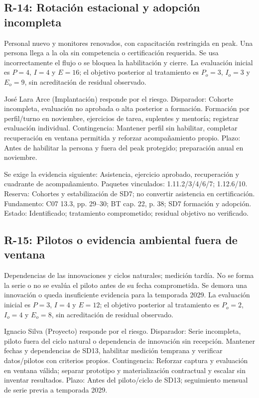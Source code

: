 \subsection{R-14: Rotación estacional y adopción incompleta}
Personal nuevo y monitores renovados, con capacitación restringida en peak. Una persona llega a la ola sin competencia o certificación requerida. Se usa incorrectamente el flujo o se bloquea la habilitación y cierre. La evaluación inicial es $P=4$, $I=4$ y $E=16$; el objetivo posterior al tratamiento es $P_o=3$, $I_o=3$ y $E_o=9$, sin acreditación de residual observado.

José Lara Arce (Implantación) responde por el riesgo. Disparador: Cohorte incompleta, evaluación no aprobada o alta posterior a formación. Formación por perfil/turno en noviembre, ejercicios de tarea, suplentes y mentoría; registrar evaluación individual. Contingencia: Mantener perfil sin habilitar, completar recuperación en ventana permitida y reforzar acompañamiento propio. Plazo: Antes de habilitar la persona y fuera del peak protegido; preparación anual en noviembre.

Se exige la evidencia siguiente: Asistencia, ejercicio aprobado, recuperación y cuadrante de acompañamiento. Paquetes vinculados: 1.11.2/3/4/6/7; 1.12.6/10. Reserva: Cohortes y estabilización de SD7; no convertir asistencia en certificación. Fundamento: C07 13.3, pp. 29–30; BT cap. 22, p. 38; SD7 formación y adopción. Estado: Identificado; tratamiento comprometido; residual objetivo no verificado. \parencites[numeral 13.3, pp.~29--30]{sd8-c07}[cap.~22, p.~38]{sd8-bt}

\subsection{R-15: Pilotos o evidencia ambiental fuera de ventana}
Dependencias de las innovaciones y ciclos naturales; medición tardía. No se forma la serie o no se evalúa el piloto antes de su fecha comprometida. Se demora una innovación o queda insuficiente evidencia para la temporada 2029. La evaluación inicial es $P=3$, $I=4$ y $E=12$; el objetivo posterior al tratamiento es $P_o=2$, $I_o=4$ y $E_o=8$, sin acreditación de residual observado.

Ignacio Silva (Proyecto) responde por el riesgo. Disparador: Serie incompleta, piloto fuera del ciclo natural o dependencia de innovación sin recepción. Mantener fechas y dependencias de SD13, habilitar medición temprana y verificar datos/pilotos con criterios propios. Contingencia: Reforzar captura y evaluación en ventana válida; separar prototipo y materialización contractual y escalar sin inventar resultados. Plazo: Antes del piloto/ciclo de SD13; seguimiento mensual de serie previa a temporada 2029.

